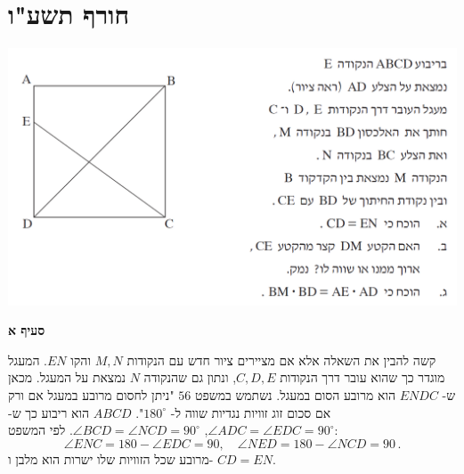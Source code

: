 \documentclass[12pt,a4paper]{article}
\begin{document}

\newpage


\section{חורף תשע"ו}

\begin{center}
\includegraphics[width=.9\textwidth]{winter-2016-4}
\end{center}

\vspace{-2mm}

\textbf{סעיף א}

קשה להבין את השאלה אלא אם מציירים ציור חדש עם הנקודות 
$M,N$
והקו
$EN$.
המעגל מוגדר כך שהוא עובר דרך הנקודות
$C,D,E$,
ונתון גם שהנקודה
$N$
נמצאת על המעגל. מכאן ש-%
$ENDC$
הוא מרובע הסום במעגל. נשתמש במשפט 
$56$
"ניתן לחסום מרובע במעגל אם ורק אם סכום זוג זוויות נגדיות שווה ל-%
$180^\circ$".
$ABCD$
הוא ריבוע כך ש-%
$\angle ADC=\angle EDC=90^\circ$,
$\angle BCD=\angle NCD=90^\circ$.
לפי המשפט:
\[
\angle ENC=180-\angle EDC=90,\quad \angle NED=180-\angle NCD=90\,.
\]
מרובע שכל הזוויות שלו ישרות הוא מלבן ו-%
$CD=EN$.
\end{document}
